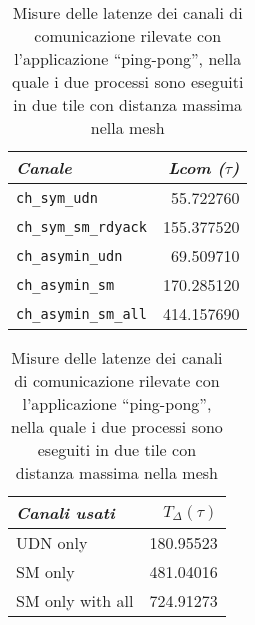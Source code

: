 \documentclass[a4paper]{article}
\begin{document}
\begin{table}[!b]
  \begin{subtable}[b]{.5\textwidth}
    \begin{tabular}{|l|r|}
      \hline
      \emph{Canale} & \emph{Lcom ($\tau$)}\\
      \hline
      \verb+ch_sym_udn+ & 55.722760 \\
      \verb+ch_sym_sm_rdyack+ & 155.377520 \\
      \verb+ch_asymin_udn+ & 69.509710 \\
      \verb+ch_asymin_sm+ & 170.285120 \\
      \verb+ch_asymin_sm_all+ & 414.157690  \\
      \hline
    \end{tabular}
  \end{subtable}
  \hspace{4ex}
  \begin{subtable}[b]{.5\textwidth}
    \begin{tabular}{|l|r|}
      \hline
      \emph{Canali usati} & $T_\Delta (\tau)$ \\
      \hline
      UDN only & 180.95523 \\
      SM only & 481.04016 \\
      SM only with all & 724.91273 \\
      \hline
    \end{tabular}
  \end{subtable}
  \caption{Misure delle latenze dei canali di comunicazione rilevate con l'applicazione ``ping-pong'', nella quale i due processi sono eseguiti in due tile con distanza massima nella mesh}
  \label{tab:ch_and_delta}
\end{table}
\end{document}
